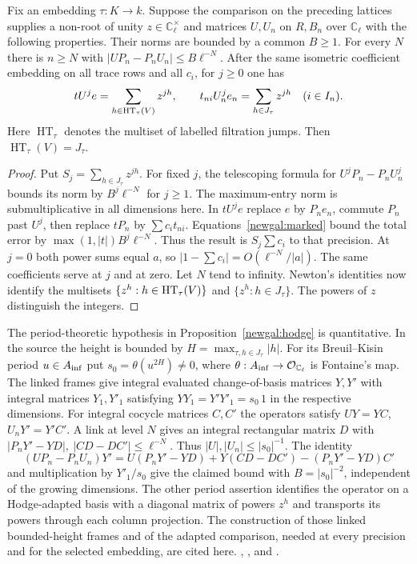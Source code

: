\begin{proposition}\label{newgal:hodge}
Fix an embedding $\tau:K\to k$. Suppose the comparison on the preceding
lattices supplies a non-root of unity $z\in\mathbb C_\ell^\times$ and matrices
$U,U_n$ on $R,B_n$ over $\mathbb C_\ell$ with the following properties.
Their norms are bounded by a common $B\ge1$. For every $N$ there is $n\ge N$
with $|UP_n-P_nU_n|\le B\ell^{-N}$. After the same isometric coefficient
embedding on all trace rows and all $c_i$, for $j\ge0$ one has
\[
 tU^je=\sum_{h\in{\rm HT}_\tau(V)}z^{jh},\qquad
 t_{ni}U_n^je_n=\sum_{h\in J_\tau}z^{jh}\quad(i\in I_n).
\]
Here $\operatorname{HT}_\tau$ denotes the multiset of labelled filtration jumps.
Then $\operatorname{HT}_\tau(V)=J_\tau$.
\end{proposition}
\begin{proof}
Put $S_j=\sum_{h\in J_\tau}z^{jh}$. For fixed $j$, the telescoping formula
for $U^jP_n-P_nU_n^j$ bounds its norm by $B^j\ell^{-N}$ for $j\ge1$.
The maximum-entry norm is submultiplicative in all dimensions here.
In $tU^je$ replace $e$ by $P_ne_n$, commute $P_n$ past $U^j$, then
replace $tP_n$ by $\sum c_it_{ni}$. Equations~\eqref{newgal:marked}
bound the total error by $\max(1,|t|)B^j\ell^{-N}$. Thus the result is
$S_j\sum c_i$ to that precision. At $j=0$ both power sums equal $a$,
so $|1-\sum c_i|=O(\ell^{-N}/|a|)$. The same coefficients serve at
$j$ and at zero. Let $N$ tend to infinity. Newton's identities now
identify the multisets $\{z^h:h\in{\rm HT}_\tau(V)\}$ and
$\{z^h:h\in J_\tau\}$. The powers of $z$ distinguish the integers.
\end{proof}

The period-theoretic hypothesis in Proposition~\ref{newgal:hodge} is
quantitative. In the source the height is bounded by
$H=\max_{\tau,h\in J_\tau}|h|$. For its Breuil--Kisin period
$u\in A_{\rm inf}$ put $s_0=\theta(u^{2H})\ne0$, where
$\theta:A_{\rm inf}\to\mathcal O_{\mathbb C_\ell}$ is Fontaine's map.
The linked frames give integral evaluated change-of-basis matrices
$Y,Y'$ with integral matrices $Y_1,Y'_1$ satisfying
$YY_1=Y'Y'_1=s_0\,1$ in the respective dimensions.
For integral cocycle matrices $C,C'$ the operators satisfy $UY=YC$,
$U_nY'=Y'C'$. A link at level $N$ gives an integral rectangular matrix
$D$ with $|P_nY'-YD|,\ |CD-DC'|\le\ell^{-N}$. Thus
$|U|,|U_n|\le |s_0|^{-1}$. The identity
\[
 (UP_n-P_nU_n)Y'=U(P_nY'-YD)+Y(CD-DC')-(P_nY'-YD)C'
\]
and multiplication by $Y'_1/s_0$ give the claimed bound with
$B=|s_0|^{-2}$, independent of the growing dimensions.
The other period assertion identifies the operator on a Hodge-adapted
basis with a diagonal matrix of powers $z^h$ and transports its powers
through each column projection. The construction of those linked
bounded-height frames and of the adapted comparison, needed at every
precision and for the selected embedding, are cited here.
,
, and
.

